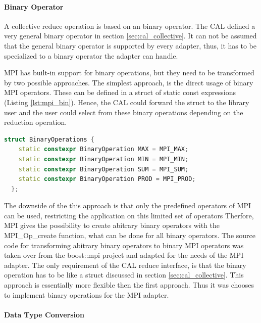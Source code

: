 \paragraph*{Binary Operator}

A collective reduce operation is based on an binary operator. The CAL
defined a very general binary operator in section
\ref{sec:cal_collective}. It can not be assumed that the general
binary operator is supported by every adapter, thus, it has to be
specialized to a binary operator the adapter can handle.

MPI has built-in support for binary operations, but they need to be
transformed by two possible approaches.  The simplest approach, is the
direct usage of binary MPI operators.  These can be defined in a
struct of static const expressions (Listing \ref{lst:mpi_bin}).
Hence, the CAL could forward the struct to the library user and the
user could select from these binary operations depending on the
reduction operation.

\begin{lstlisting}[language=C++, caption={A small collection of binary operators by transformed MPI operations to static constexpression }, label=lst:mpi_bin]
  struct BinaryOperations { 
    static constexpr BinaryOperation MAX = MPI_MAX; 
    static constexpr BinaryOperation MIN = MPI_MIN; 
    static constexpr BinaryOperation SUM = MPI_SUM; 
    static constexpr BinaryOperation PROD = MPI_PROD; 
  };
\end{lstlisting}

The downside of the this approach is that only the predefined
operators of MPI can be used, restricting the application on this
limited set of operators Therfore, MPI gives the possibility to create
abitrary binary operators with the MPI\_Op\_create function, what can
be done for all binary operators. The source code for transforming
abitrary binary operators to binary MPI operators was taken over from
the boost::mpi project and adapted for the needs of the MPI adapter.
The only requirement of the CAL reduce interface, is that the binary
operation has to be like a struct discussed in section
\ref{sec:cal_collective}. This approach is essentially more flexible
then the first approach. Thus it was chooses to implement binary
operations for the MPI adapter.

\paragraph*{Data Type Conversion}

